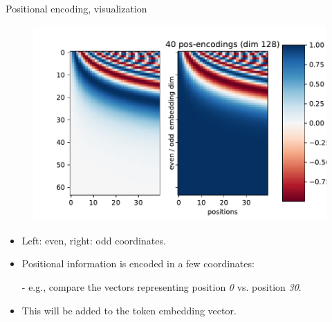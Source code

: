 \begin{frame}{Positional encoding, visualization}
\vspace{-5mm}
\begin{figure}
\centering
\includegraphics[width=.7\linewidth]{./figures/pos_enc.pdf}
\end{figure}
\begin{itemize}
\item Left: even, right: odd coordinates.
\item Positional information is encoded in a few coordinates:
\item[-] e.g., compare the vectors representing position \textit{0} vs. position \textit{30}.
\item This will be added to the token embedding vector.
\end{itemize}
\end{frame}


